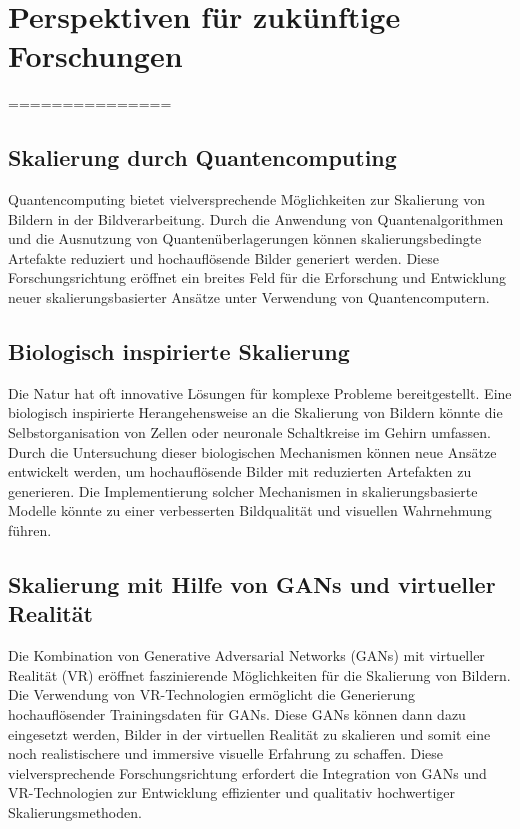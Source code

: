 \section{Perspektiven für zukünftige Forschungen}







===============



\subsection{Skalierung durch Quantencomputing}
Quantencomputing bietet vielversprechende Möglichkeiten zur Skalierung von Bildern in der Bildverarbeitung. Durch die Anwendung von Quantenalgorithmen und die Ausnutzung von Quantenüberlagerungen können skalierungsbedingte Artefakte reduziert und hochauflösende Bilder generiert werden. Diese Forschungsrichtung eröffnet ein breites Feld für die Erforschung und Entwicklung neuer skalierungsbasierter Ansätze unter Verwendung von Quantencomputern.

\subsection{Biologisch inspirierte Skalierung}
Die Natur hat oft innovative Lösungen für komplexe Probleme bereitgestellt. Eine biologisch inspirierte Herangehensweise an die Skalierung von Bildern könnte die Selbstorganisation von Zellen oder neuronale Schaltkreise im Gehirn umfassen. Durch die Untersuchung dieser biologischen Mechanismen können neue Ansätze entwickelt werden, um hochauflösende Bilder mit reduzierten Artefakten zu generieren. Die Implementierung solcher Mechanismen in skalierungsbasierte Modelle könnte zu einer verbesserten Bildqualität und visuellen Wahrnehmung führen.

\subsection{Skalierung mit Hilfe von GANs und virtueller Realität}
Die Kombination von Generative Adversarial Networks (GANs) mit virtueller Realität (VR) eröffnet faszinierende Möglichkeiten für die Skalierung von Bildern. Die Verwendung von VR-Technologien ermöglicht die Generierung hochauflösender Trainingsdaten für GANs. Diese GANs können dann dazu eingesetzt werden, Bilder in der virtuellen Realität zu skalieren und somit eine noch realistischere und immersive visuelle Erfahrung zu schaffen. Diese vielversprechende Forschungsrichtung erfordert die Integration von GANs und VR-Technologien zur Entwicklung effizienter und qualitativ hochwertiger Skalierungsmethoden.

